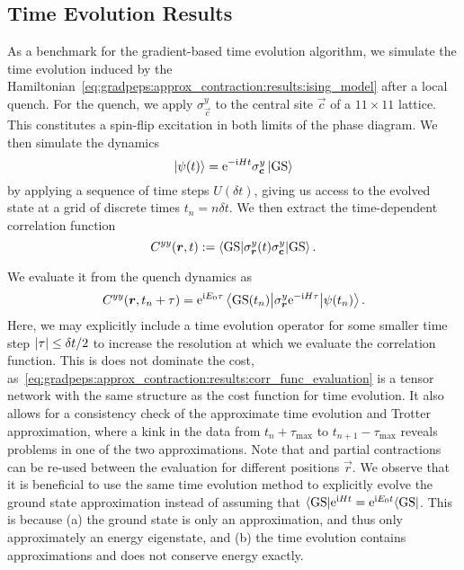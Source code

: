 \subsection{Time Evolution Results}


As a benchmark for the gradient-based time evolution algorithm, we simulate the time evolution induced by the  Hamiltonian~\eqref{eq:gradpeps:approx_contraction:results:ising_model}
after a local quench.
%
For the quench, we apply $\sigma^y_{\vec{c}}$ to the central site $\vec{c}$ of a $11 \times 11$ lattice.
%
This constitutes a spin-flip excitation in both limits of the phase diagram.
%
We then simulate the dynamics
\begin{equation}
    \label{eq:gradpeps:approx_contraction:results:qunech_setup}
    \ket{\psi(t)}
    = \eto{-\im H t} \sigma^y_{\vec{c}} \GSket
\end{equation}
by applying a sequence of time steps $U(\delta t)$, giving us access to the evolved state at a grid of discrete times $t_n = n \delta t$.
%
We then extract the time-dependent correlation function
\begin{equation}
    \label{eq:gradpeps:approx_contraction:results:def_corr_func}
    C^{yy}(\vec{r}, t)
    := \braopket{\text{GS}}{\sigma^y_{\vec{r}}(t) \sigma^y_{\vec{c}}}{\text{GS}}
    .
\end{equation}



We evaluate it from the quench dynamics as
\begin{equation}
    \label{eq:gradpeps:approx_contraction:results:corr_func_evaluation}
    C^{yy}(\vec{r}, t_n + \tau)
    = \eto{\im E_0 \tau} \braopket{\text{GS}(t_n)}{\sigma^y_{\vec{r}} \eto{-\im H \tau}}{\psi(t_n)}
    .
\end{equation}
Here, we may explicitly include a time evolution operator for some smaller time step $\abs{\tau} \leq \delta t / 2$ to increase the resolution at which we evaluate the correlation function.
%
This is does not dominate the cost, as~\eqref{eq:gradpeps:approx_contraction:results:corr_func_evaluation} is a tensor network with the same structure as the cost function for time evolution.
%
It also allows for a consistency check of the approximate time evolution and Trotter approximation, where a kink in the data from $t_n + \tau_\text{max}$ to $t_{n+1} - \tau_\text{max}$ reveals problems in one of the two approximations.
%
Note that  and partial contractions can be re-used between the evaluation for different positions $\vec{r}$.
%
We observe that it is beneficial to use the same time evolution method to explicitly evolve the ground state approximation instead of assuming that $\bra{\text{GS}} \eto{\im H t} = \eto{\im E_0 t} \bra{\text{GS}}$.
%
This is because (a) the ground state is only an approximation, and thus only approximately an energy eigenstate, and (b) the time evolution contains approximations and does not conserve energy exactly.
%



